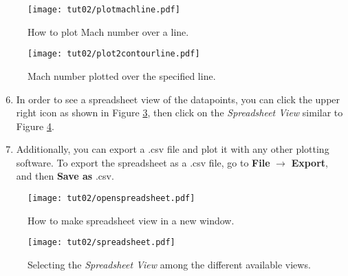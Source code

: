\begin{figure}[H]
	\centering
	\texttt{[image: tut02/plotmachline.pdf]}
	\caption{How to plot Mach number over a line.}
	\label{fig2:plot_line_setting}
\end{figure}
\begin{figure}[ht]
	\centering
	\texttt{[image: tut02/plot2contourline.pdf]}
	\caption{Mach number plotted over the specified line.}
	\label{fig2:plot_line}
\end{figure}
\begin{enumerate}[label=\arabic*)]
	\setcounter{enumi}{5}
	\item In order to see a spreadsheet view of the datapoints, you can click the upper right icon as shown in Figure \ref{fig2:open_spreadsheet}, then click on the \textit{Spreadsheet View} similar to Figure \ref{fig2:spreadsheet}.
	\item Additionally, you can export a .csv file and plot it with any other plotting software. To export the spreadsheet as a .csv file, go to \textbf{File} $\rightarrow$ \textbf{Export}, and then \textbf{Save as} .csv.
\end{enumerate}
\begin{figure}[ht]
    \centering
    \texttt{[image: tut02/openspreadsheet.pdf]}
    \caption{How to make spreadsheet view in a new window.}
    \label{fig2:open_spreadsheet}
\end{figure}
\begin{figure}[ht]
    \centering
    \texttt{[image: tut02/spreadsheet.pdf]}
    \caption{Selecting the \textit{Spreadsheet View} among the different available views.}
    \label{fig2:spreadsheet}
\end{figure}

